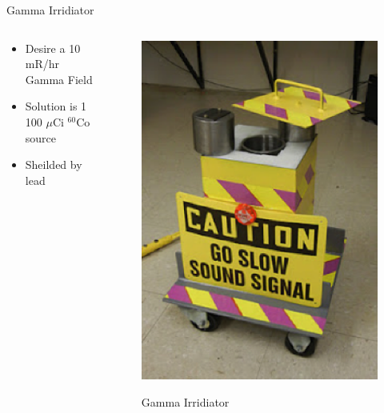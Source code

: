 \begin{frame}{Gamma Irridiator}
\begin{columns}[onlytextwidth]
\begin{column}{0.45\textwidth}
	\begin{itemize}
		\item Desire a 10 mR/hr Gamma Field
		\item Solution is 1 100 $\mu$Ci ${}^{60}$Co source
		\item Sheilded by lead
	\end{itemize}
\end{column}
\begin{column}{0.45\textwidth}
	\centering
	\begin{figure}
		\includegraphics[width=\textwidth]{images/GammaIrridiator.eps}
		\label{fig:GammaIrridiator}
		\caption{Gamma Irridiator}
	\end{figure}
\end{column}
\end{columns}
\end{frame}

